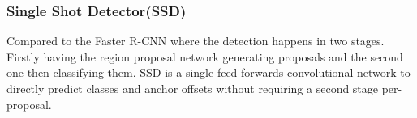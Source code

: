 \subsubsection{Single Shot Detector(SSD)}
Compared to the Faster R-CNN where the detection happens in two stages. Firstly having the region proposal network generating proposals and
the second one then classifying them. SSD is a single feed forwards convolutional network to directly predict classes and anchor offsets
without requiring a second stage per-proposal.

     

